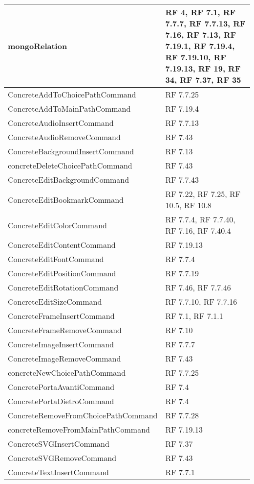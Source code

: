 {\begin{center}
\begin{longtable} [c]{| p{7cm} | p{6cm} |}
 \hline 
mongoRelation & RF 4, RF 7.1, RF 7.7.7, RF 7.7.13, RF 7.16, RF 7.13, RF 7.19.1, RF 7.19.4, RF 7.19.10, RF 7.19.13, RF 19, RF 34, RF 7.37, RF 35\\
 \hline 
ConcreteAddToChoicePathCommand & RF 7.7.25\\ 
 \hline 
ConcreteAddToMainPathCommand & RF 7.19.4\\ 
 \hline 
ConcreteAudioInsertCommand & RF 7.7.13\\ 
 \hline 
ConcreteAudioRemoveCommand & RF 7.43\\ 
 \hline 
ConcreteBackgroundInsertCommand & RF 7.13\\ 
 \hline 
concreteDeleteChoicePathCommand & RF 7.43\\ 
 \hline 
ConcreteEditBackgroundCommand & RF 7.7.43\\ 
 \hline 
ConcreteEditBookmarkCommand & RF 7.22, RF 7.25, RF 10.5, RF 10.8\\ 
 \hline 
ConcreteEditColorCommand & RF 7.7.4, RF 7.7.40, RF 7.16, RF 7.40.4\\ 
 \hline 
ConcreteEditContentCommand & RF 7.19.13\\ 
 \hline 
ConcreteEditFontCommand & RF 7.7.4\\ 
 \hline 
ConcreteEditPositionCommand & RF 7.7.19\\ 
 \hline 
ConcreteEditRotationCommand & RF 7.46, RF 7.7.46\\ 
 \hline 
ConcreteEditSizeCommand & RF 7.7.10, RF 7.7.16\\ 
 \hline 
ConcreteFrameInsertCommand & RF 7.1, RF 7.1.1\\ 
 \hline 
ConcreteFrameRemoveCommand & RF 7.10\\ 
 \hline 
ConcreteImageInsertCommand & RF 7.7.7\\ 
 \hline 
ConcreteImageRemoveCommand & RF 7.43\\ 
 \hline 
concreteNewChoicePathCommand & RF 7.7.25\\ 
 \hline 
ConcretePortaAvantiCommand &  RF 7.4 \\ 
 \hline 
ConcretePortaDietroCommand &  RF 7.4 \\
 \hline 
ConcreteRemoveFromChoicePathCommand & RF 7.7.28\\ 
 \hline 
concreteRemoveFromMainPathCommand & RF 7.19.13\\ 
 \hline 
ConcreteSVGInsertCommand & RF 7.37\\ 
 \hline 
ConcreteSVGRemoveCommand & RF 7.43\\ 
 \hline 
ConcreteTextInsertCommand & RF 7.7.1\\ 

\end{longtable}
\end{center}}
